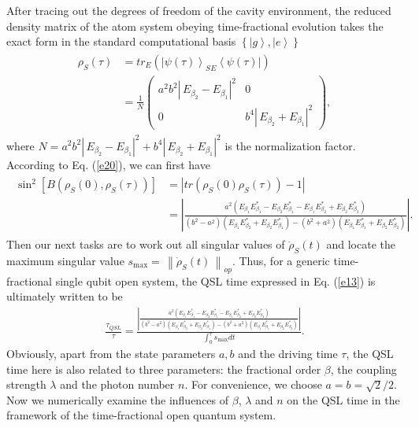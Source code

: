 \documentclass[
showpacs,  %
showkeys,  %
aps,       %
amsthm,    %
amsmath,   %
amsfonts,  %
amssymb    %
]{revtex4-1}          %
\begin{document}
After tracing out the degrees of freedom of the cavity environment, the reduced density matrix of the atom system obeying time-fractional evolution takes the exact form in the standard computational basis $\left\{ {\left| g \right\rangle,\left| e \right\rangle } \right\}$
\begin{eqnarray}
\label{e20}
\begin{aligned}
{\rho _S}(\tau ) &= t{r_E}({\left| {\psi (\tau )} \right\rangle _{SE}}\left\langle {\psi (\tau )} \right|)\\
\,\,\,\,\,\,\,\,\,\,\,\,\, &= \frac{1}{N}\left( {\begin{array}{*{20}{c}}
{{a^2}{b^2}{{\left| {\,{E_{{\beta _2}}} - {E_{{\beta _1}}}} \right|}^2}}&0\\
0&{{b^4}{{\left| {\,{E_{{\beta _2}}} + {E_{{\beta _1}}}} \right|}^2}}
\end{array}} \right),
\end{aligned}
\end{eqnarray}
where $N = {a^2}{b^2}{\left| {\,{E_{{\beta _2}}} - {E_{{\beta _1}}}} \right|^2} + {b^4}{\left| {\,{E_{{\beta _2}}} + {E_{{\beta _1}}}} \right|^2}$ is the normalization factor. According to Eq. (\ref{e20}), we can first have
\begin{eqnarray}
\label{e21}
\begin{aligned}
{\sin ^2}\left[ {B({\rho _S}(0),{\rho _S}(\tau ))} \right] &= \left| {tr({\rho _S}(0){\rho _S}(\tau )) - 1} \right|\\
&= \left| {\frac{{{a^2}({E_{{\beta _1}}}E_{{\beta _1}}^ *  - {E_{{\beta _2}}}E_{{\beta _1}}^ *  - {E_{{\beta _1}}}E_{{\beta _2}}^ *  + {E_{{\beta _2}}}E_{{\beta _2}}^ * )}}{{({b^2} - {a^2})({E_{{\beta _1}}}E_{{\beta _2}}^ *  + {E_{{\beta _2}}}E_{{\beta _1}}^ * ) - ({b^2}+{a^2})({E_{{\beta _1}}}E_{{\beta _1}}^ *  + {E_{{\beta _2}}}E_{{\beta _2}}^ * )}}}\right|.
\end{aligned}
\end{eqnarray}
Then our next tasks are to work out all singular values of ${\dot \rho _S}(t)$ and locate the maximum singular value ${s_{\max }} = \,{\left\| {{{\dot \rho }_S}(t)\,} \right\|_{op}}$. Thus, for a generic time-fractional single qubit open system, the QSL time expressed in Eq. (\ref{e13}) is ultimately written to be
\begin{eqnarray}
\label{e22}
\frac{{{\tau _{QSL}}}}{\tau } = \frac{{\left| {\frac{{a^2({E_{{\beta _1}}}E_{{\beta _1}}^ *  - {E_{{\beta _2}}}E_{{\beta _1}}^ *  - {E_{{\beta _1}}}E_{{\beta _2}}^ *  + {E_{{\beta _2}}}E_{{\beta _2}}^ * )}}{{({b^2} - {a^2})({E_{{\beta _1}}}E_{{\beta _2}}^ *  + {E_{{\beta _2}}}E_{{\beta _1}}^ * )-({b^2}+{a^2})({E_{{\beta _1}}}E_{{\beta _1}}^ *  + {E_{{\beta _2}}}E_{{\beta _2}}^ * )}}} \right|}}{{\int_0^\tau  {{s_{\max }}} dt}}.
\end{eqnarray}
Obviously, apart from the state parameters $a, b$ and the driving time $\tau$, the QSL time here is also related to three parameters: the fractional order $\beta$, the coupling strength $\lambda$ and the photon number $n$. For convenience, we choose $a=b=\sqrt{2}/2$. Now we numerically examine the influences of $\beta$, $\lambda$ and $n$ on the QSL time in the framework of the time-fractional open quantum system.
\end{document}
